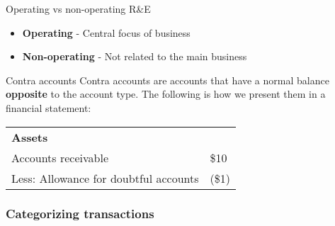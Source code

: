\begin{knBox}
    {Operating vs non-operating R\&E}
    \begin{itemize}
        \item \textbf{Operating} - Central focus of business
        \item \textbf{Non-operating} - Not related to the main business
    \end{itemize}
\end{knBox}

\begin{knBox}
    {Contra accounts}
    Contra accounts are accounts that have a normal balance \textbf{opposite} to the account type. The following is how we present them in a financial statement:

    \tcblower

    \begin{tabular}{ll}
        \textbf{Assets}                             &       \\
        Accounts receivable                         & \$10  \\
        \quad Less: Allowance for doubtful accounts & (\$1) \\
    \end{tabular}
\end{knBox}
\label{def:contra}

\subsubsection{Categorizing transactions}

